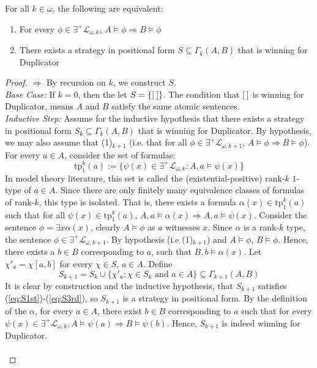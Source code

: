 \begin{prop}
For all $k \in \omega$, the following are equivalent:
\begin{enumerate}[label=(\arabic*)$_{k}$]
\item For every $\phi \in \exists^{+}\mathcal{L}_{\omega,k}$, $A \vDash \phi \Rightarrow B \vDash \phi$
\item There exists a strategy in positional form $S \subseteq \Gamma_{k}(A,B)$ that is winning for Duplicator 
\end{enumerate}
\begin{proof}
$\Rightarrow$ By recursion on $k$, we construct $S$. \\
\textit{Base Case:} If $k = 0$, then the let $S = \{{[\:]}\}$. The condition that ${[\:]}$ is winning for Duplicator, means $A$ and $B$ satisfy the same atomic sentences. \\
\textit{Inductive Step:} Assume for the inductive hypothesis that there exists a strategy in positional form $S_{k} \subseteq \Gamma_{k}(A,B)$ that is winning for Duplicator. By hypothesis, we may also assume that (1)$_{k+1}$ (i.e. that for all $\phi \in \exists^{+}\mathcal{L}_{\omega,k+1}$, $A \vDash \phi \Rightarrow B \vDash \phi$). For every $a \in A$, consider the set of formulas: 
$$\text{tp}^{k}_{1}(a) := \{\psi(x) \in \exists^{+}\mathcal{L}_{\omega,k}: A,a \vDash\psi(x) \} $$ 
In model theory literature, this set is called the (existential-positive) rank-$k$ $1$-type of $a \in A$. Since there are only finitely many equivalence classes of formulas of rank-$k$, this type is isolated. That is, there exists a formula $\alpha(x) \in \text{tp}^{k}_{1}(a)$ such that for all $\psi(x) \in \text{tp}^{k}_{1}(a)$, $A,a \vDash \alpha(x) \Rightarrow A,a \vDash \psi(x)$. Consider the sentence $\phi = \exists x \alpha(x)$, clearly $A \vDash \phi$ as $a$ witnesses $x$. Since $\alpha$ is a rank-$k$ type, the sentence $\phi \in \exists^{+}\mathcal{L}_{\omega,k+1}$. By hypothesis (i.e (1)$_{k+1}$) and $A \vDash \phi$, $B \vDash \phi$. Hence, there exists a $b \in B$ corresponding to $a$, such that $B,b \vDash \alpha(x)$.  Let $\chi'_{a} = \chi[a,b]$ for every $\chi \in S$, $a \in A$.  Define
$$S_{k+1} =  S_{k} \cup \{\chi'_{a} : \chi \in S_{k} \text{ and }  a \in A \} \subseteq \Gamma_{k+1}(A,B)$$
It is clear by construction and the inductive hypothesis, that $S_{k+1}$ satisfies (\ref{eq:S1st})-(\ref{eq:S3rd}), so $S_{k+1}$ is a strategy in positional form. By the definition of the $\alpha$, for every $a \in A$, there exist $b \in B$ corresponding to $a$ such that for every $\psi(x) \in \exists^{+}\mathcal{L}_{\omega,k}, A \vDash \psi(a) \Rightarrow B \vDash \psi(b)$. Hence, $S_{k+1}$ is indeed winning for Duplicator. \\~\\

\end{proof}
\end{prop}
